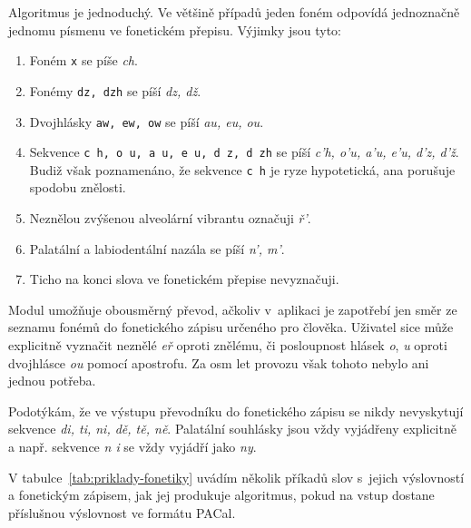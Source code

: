 Algoritmus je jednoduchý. Ve většině případů jeden foném odpovídá jednoznačně
jednomu písmenu ve fonetickém přepisu. Výjimky jsou tyto:
\begin{enumerate}
\item{Foném \texttt{x} se píše {\em ch}.}
\item{Fonémy \texttt{dz, dzh} se píší {\em dz, dž}.}
\item{Dvojhlásky \texttt{aw, ew, ow} se píší {\em au, eu, ou}.}
\item{
    Sekvence \texttt{c h, o u, a u, e u, d z, d zh} se píší
    {\em c'h, o'u, a'u, e'u, d'z, d'ž}.
    Budiž však poznamenáno, že sekvence \texttt{c h} je ryze hypotetická, ana
    porušuje spodobu znělosti.
}
\item{
    Neznělou zvýšenou alveolární vibrantu označuji {\em ř'}.
}
\item{
    Palatální a labiodentální nazála se píší {\em n', m'}.
}
\item{Ticho na konci slova ve fonetickém přepise nevyznačuji.}
\end{enumerate}

Modul umožňuje obousměrný převod, ačkoliv v~aplikaci je zapotřebí jen směr ze seznamu fonémů do
fonetického zápisu určeného pro člověka. Uživatel sice může explicitně vyznačit
neznělé {\em eř} oproti znělému, či posloupnost hlásek {\em o}, {\em u} oproti
dvojhlásce {\em ou} pomocí apostrofu. Za osm let provozu však tohoto nebylo ani
jednou potřeba.

Podotýkám, že ve výstupu převodníku do fonetického zápisu se nikdy nevyskytují
sekvence {\em di, ti, ni, dě, tě, ně}. Palatální souhlásky jsou vždy vyjádřeny
explicitně a např. sekvence {\em n i} se vždy vyjádří jako {\em ny}.

V tabulce~\ref{tab:priklady-fonetiky} uvádím několik příkadů slov s~jejich výslovností a fonetickým zápisem, jak jej
produkuje algoritmus, pokud na vstup dostane příslušnou výslovnost ve formátu
PACal.

